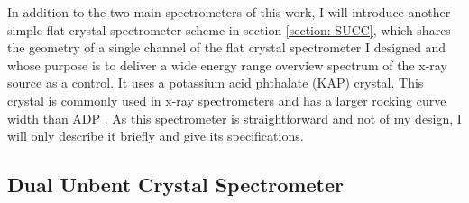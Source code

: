 In addition to the two main spectrometers of this work, I will introduce 
another simple flat crystal spectrometer scheme in section \ref{section: SUCC}, which shares the geometry of a single channel of the flat crystal spectrometer I designed and
whose purpose is to deliver a wide energy range overview spectrum of the 
x-ray source as a control. It uses a potassium acid phthalate (KAP) 
crystal. This crystal is commonly used in x-ray spectrometers and has a 
larger rocking curve width than ADP \citep{kunze2009introduction, 
loisel2016measurement}. As this spectrometer is straightforward and not 
of my design, I will only describe it briefly and give its 
specifications.


\subsection{Dual Unbent Crystal Spectrometer}
\label{section:DUCC design}


